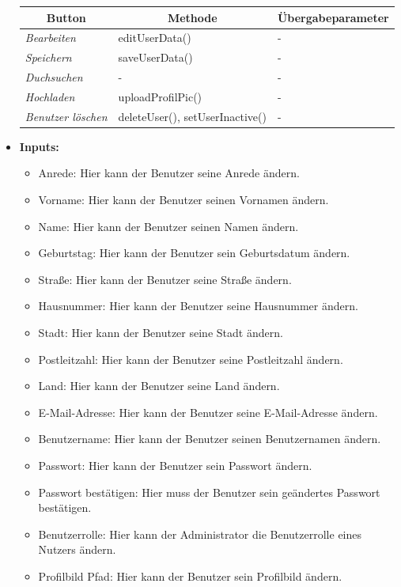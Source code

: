 \begin{itemize}
\begin{center}
\begin{longtable}{|p{4cm} |p{6cm} | p{4cm}|}
							\hline \multicolumn{1}{|c|}{\textbf{Button}} & \multicolumn{1}{|c|}{\textbf{Methode}} & \multicolumn{1}{|c|}{\textbf{\"{U}bergabeparameter}} \\ \hline
							\endfirsthead
							\hline
							\endlastfoot
							
							\textit{Bearbeiten } & editUserData() & - \\ \hline
							\textit{Speichern } & saveUserData() & - \\ \hline
							\textit{Duchsuchen } & - & - \\ \hline
							\textit{Hochladen } & uploadProfilPic() & - \\ \hline
							\textit{Benutzer löschen} &  deleteUser(), setUserInactive()  & - \\ \hline
						\end{longtable}
					\end{center}
				
			\item \textbf{Inputs:}
				\begin{itemize}
					\item Anrede: Hier kann der Benutzer seine Anrede ändern.
					\item Vorname: Hier kann der Benutzer seinen Vornamen ändern.
					\item Name: Hier kann der Benutzer seinen Namen ändern.
					\item Geburtstag: Hier kann der Benutzer sein Geburtsdatum ändern.
					\item Straße: Hier kann der Benutzer seine Straße ändern.
					\item Hausnummer: Hier kann der Benutzer seine Hausnummer ändern.
					\item Stadt: Hier kann der Benutzer seine Stadt ändern.
					\item Postleitzahl: Hier kann der Benutzer seine Postleitzahl ändern.
					\item Land: Hier kann der Benutzer seine Land ändern.
					\item E-Mail-Adresse: Hier kann der Benutzer seine E-Mail-Adresse ändern.
					\item Benutzername: Hier kann der Benutzer seinen Benutzernamen ändern.
					\item Passwort: Hier kann der Benutzer sein Passwort ändern.
					\item Passwort bestätigen: Hier muss der Benutzer sein geändertes Passwort bestätigen.
					\item Benutzerrolle: Hier kann der Administrator die Benutzerrolle eines Nutzers ändern.
					\item Profilbild Pfad: Hier kann der Benutzer sein Profilbild ändern.
				\end{itemize}
				

\end{itemize}
